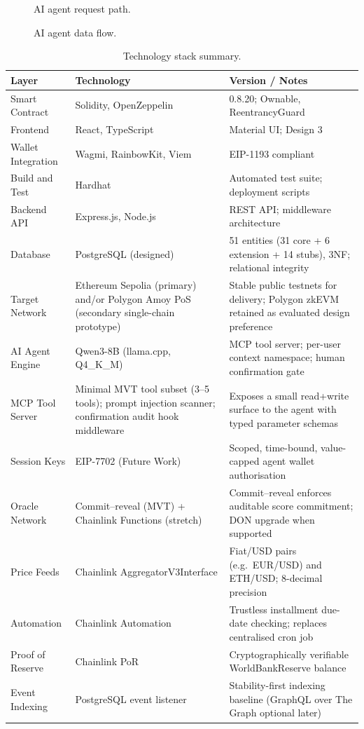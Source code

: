 \begin{figure}[H]
\centering
{}
\caption[AI agent request path]{AI agent request path.}
\label{fig:local-llm-mermaid}
\end{figure}

\begin{figure}[H]
\centering
{}
\caption[AI agent data flow]{AI agent data flow.}
\label{fig:local-llm-tikz}
\end{figure}

\begin{table}[H]
\centering
\caption[Technology stack summary]{Technology stack summary.}
\label{tab:tech-stack}
\begin{tabular}{p{3cm}p{4cm}p{6.5cm}}
\toprule
\tableheadcolor
\textbf{Layer} & \textbf{Technology} & \textbf{Version / Notes} \\
\midrule
Smart Contract & Solidity, OpenZeppelin & 0.8.20; Ownable, ReentrancyGuard \\
Frontend & React, TypeScript & Material UI; Design 3 \\
Wallet Integration & Wagmi, RainbowKit, Viem & EIP-1193 compliant \\
Build and Test & Hardhat & Automated test suite; deployment scripts \\
Backend API & Express.js, Node.js & REST API; middleware architecture \\
Database & PostgreSQL (designed) & 51 entities (31 core + 6 extension + 14 stubs), 3NF; relational integrity \\
Target Network & Ethereum Sepolia (primary) and/or Polygon Amoy PoS (secondary single-chain prototype) & Stable public testnets for delivery; Polygon zkEVM retained as evaluated design preference \\
AI Agent Engine & Qwen3-8B (llama.cpp, Q4\_K\_M) & MCP tool server; per-user context namespace; human confirmation gate \\
MCP Tool Server & Minimal MVT tool subset (3--5 tools); prompt injection scanner; confirmation audit hook middleware & Exposes a small read+write surface to the agent with typed parameter schemas \\
Session Keys & EIP-7702 (Future Work) & Scoped, time-bound, value-capped agent wallet authorisation \\
Oracle Network & Commit--reveal (MVT) + Chainlink Functions (stretch) & Commit--reveal enforces auditable score commitment; DON upgrade when supported \\
Price Feeds & Chainlink AggregatorV3Interface & Fiat/USD pairs (e.g.\ EUR/USD) and ETH/USD; 8-decimal precision \\
Automation & Chainlink Automation & Trustless installment due-date checking; replaces centralised cron job \\
Proof of Reserve & Chainlink PoR & Cryptographically verifiable WorldBankReserve balance \\
Event Indexing & PostgreSQL event listener & Stability-first indexing baseline (GraphQL over The Graph optional later) \\
\bottomrule
\end{tabular}
\end{table}

